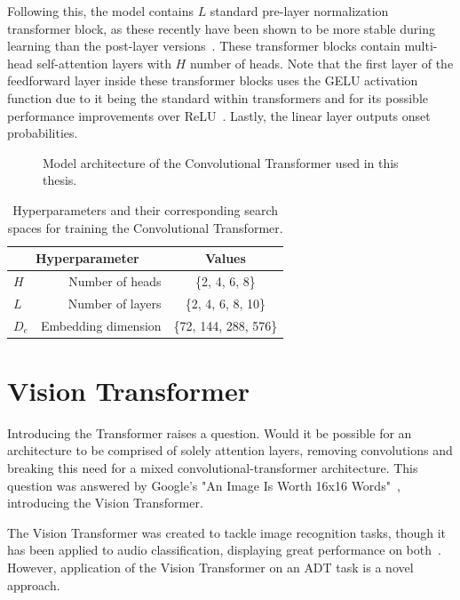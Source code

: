 Following this, the model contains $L$ standard pre-layer normalization transformer block, as these recently have been shown to be more stable during learning than the post-layer versions~\cite{pmlr-v119-xiong20b}. These transformer blocks contain multi-head self-attention layers with $H$ number of heads. Note that the first layer of the feedforward layer inside these transformer blocks uses the \gls{GELU} activation function due to it being the standard within transformers and for its possible performance improvements over \gls{ReLU}~\cite{devlin-etal-2019-bert, hendrycks2023gaussianerrorlinearunits}. Lastly, the linear layer outputs onset probabilities.

\begin{figure}[H]
    \centering
    
    \caption{Model architecture of the Convolutional Transformer used in this thesis.}
    \label{CTFigure}
\end{figure}

\begin{table}[H]
    \centering
    \begin{tabular}{lr|c}
        \multicolumn{2}{c|}{Hyperparameter} & Values       \\
        \hline
        $H$ & Number of heads     & \{2, 4, 6, 8\} \\
        $L$ & Number of layers      & \{2, 4, 6, 8, 10\} \\
        $D_e$ & Embedding dimension      & \{72, 144, 288, 576\} \\
    \end{tabular}
    \caption{Hyperparameters and their corresponding search spaces for training the Convolutional Transformer.}
    \label{CTHyperparams}
\end{table}

\section{Vision Transformer}

Introducing the Transformer raises a question. Would it be possible for an architecture to be comprised of solely attention layers, removing convolutions and breaking this need for a mixed convolutional-transformer architecture. This question was answered by Google's "An Image Is Worth 16x16 Words"~\cite{dosovitskiy2021imageworth16x16words}, introducing the Vision Transformer.

The Vision Transformer was created to tackle image recognition tasks, though it has been applied to audio classification, displaying great performance on both~\cite{dosovitskiy2021imageworth16x16words, gong2021astaudiospectrogramtransformer}. However, application of the Vision Transformer on an \gls{ADT} task is a novel approach.


